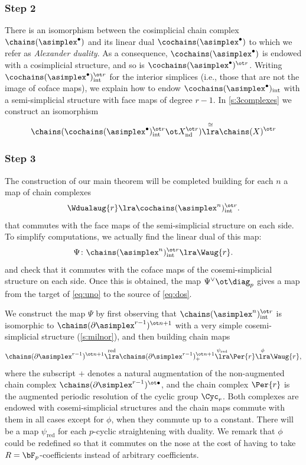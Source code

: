 \subsubsection*{Step 2} There is an isomorphism between the cosimplicial chain complex $\chains(\asimplex^{\bullet})$ and its linear dual $\cochains(\asimplex^{\bullet})$ to which we refer as \emph{Alexander duality}. As a consequence, $\cochains(\asimplex^{\bullet})$ is endowed with a cosimplicial structure, and so is $\cochains(\asimplex^{\bullet})^{\ot r}$. Writing $\cochains(\asimplex^{\bullet})_{\mathrm{int}}^{\ot r}$ for the interior simplices (i.e., those that are not the image of coface maps), we explain how to endow $\cochains(\asimplex^{\bullet})_{\mathrm{int}}$ with a semi-simplicial structure with face maps of degree $r-1$. In \cref{s:3complexes} we construct an isomorphism
\begin{equation}\label{eq:dos}
	 \chains(\cochains(\asimplex^{\bullet})_{\mathrm{int}}^{\ot r}\ot X_{\mathrm{nd}}^{\ot r})
	 \overset{\cong}{\lra}
	 \chains(X)^{\ot r}
\end{equation}

\subsubsection*{Step 3} The construction of our main theorem will be completed building for each $n$ a map of chain complexes 
\[
\Wdualaug{r}\lra \cochains(\asimplex^{n})^{\ot r}_{\mathrm{int}}.
\]
that commutes with the face maps of the semi-simplicial structure on each side. To simplify computations, we actually find the linear dual of this map:
\[
	\Psi\colon \chains(\asimplex^n)_{\mathrm{int}}^{\ot r}\lra \Waug{r}. 
\]
and check that it commutes with the coface maps of the cosemi-simplicial structure on each side. Once this is obtained, the map $\Psi^{\vee}\ot \diag_p$ gives a map from the target of \eqref{eq:uno} to the source of \eqref{eq:dos}.

We construct the map $\Psi$ by first observing that $\chains(\asimplex^n)_{\mathrm{int}}^{\ot r}$ is isomorphic to $\chains(\partial\asimplex^{r-1})^{\ot n+1}$ with a very simple cosemi-simplicial structure (\cref{s:milnor}), and then building chain maps
\[
	\chains(\partial\asimplex^{r-1})^{\ot n+1}
	\overset{\mathrm{red}}{\lra}
	\chains(\partial\simplex^{r-1})^{\ot n+1}_+
	\overset{\psi_{\mathrm{red}}}{\lra}
	\Per{r}
	\overset{\phi}{\lra} 
	\Waug{r},
\]
where the subscript $+$ denotes a natural augmentation of the non-augmented chain complex $\chains(\partial\simplex^{r-1})^{\ot \bullet}$, and the chain complex $\Per{r}$ is the augmented periodic resolution of the cyclic group $\Cyc_r$. Both complexes are endowed with cosemi-simplicial structures and the chain maps commute with them in all cases except for $\phi$, when they commute up to a constant. There will be a map $\psi_{\mathrm{red}}$ for each $p$-cyclic straightening with duality. We remark that $\phi$ could be redefined so that it commutes on the nose at the cost of having to take $R=\bF_p$-coefficients instead of arbitrary coefficients.

